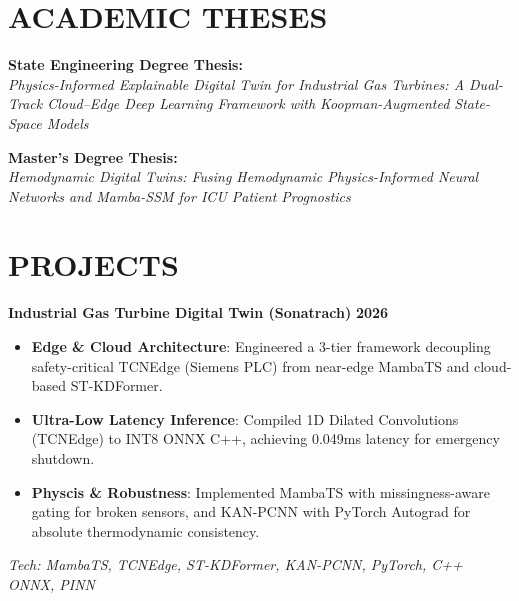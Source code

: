 \documentclass[a4paper,12pt]{article}
\begin{document}
\section{ACADEMIC THESES}
\textbf{State Engineering Degree Thesis:} \\
\textit{Physics-Informed Explainable Digital Twin for Industrial Gas Turbines: A Dual-Track Cloud–Edge Deep Learning Framework with Koopman-Augmented State-Space Models}

\vspace{4pt}
\textbf{Master's Degree Thesis:} \\
\textit{Hemodynamic Digital Twins: Fusing Hemodynamic Physics-Informed Neural Networks and Mamba-SSM for ICU Patient Prognostics}

\vspace{8pt}
\section{PROJECTS}
\setlength{\parskip}{0pt}

\noindent\textbf{\large Industrial Gas Turbine Digital Twin (Sonatrach)} \hfill \textbf{2026}
\vspace{2pt}
{\small
\begin{itemize}
    \item \textbf{Edge \& Cloud Architecture}: Engineered a 3-tier framework decoupling safety-critical TCNEdge (Siemens PLC) from near-edge MambaTS and cloud-based ST-KDFormer.
    \item \textbf{Ultra-Low Latency Inference}: Compiled 1D Dilated Convolutions (TCNEdge) to INT8 ONNX C++, achieving 0.049ms latency for emergency shutdown.
    \item \textbf{Physcis \& Robustness}: Implemented MambaTS with missingness-aware gating for broken sensors, and KAN-PCNN with PyTorch Autograd for absolute thermodynamic consistency.
\end{itemize}
\textit{Tech: MambaTS, TCNEdge, ST-KDFormer, KAN-PCNN, PyTorch, C++ ONNX, PINN}
}
\vspace{8pt}
\end{document}
